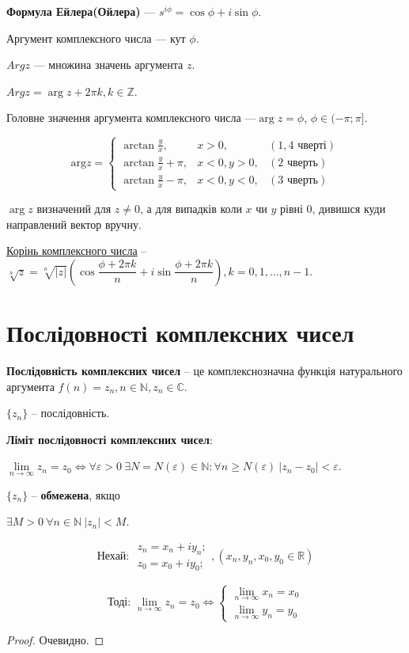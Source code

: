 \textbf{Формула Ейлера(Ойлера)} --- $s^{i \phi} = \cos \phi + i \sin \phi$.

Аргумент комплексного числа --- кут $\phi$.

$Arg z$ --- множина значень аргумента $z$.

$Arg z =  \arg z + 2 \pi k, k \in \mathbb{Z}$.

Головне значення аргумента комплексного числа ---$\arg z =  \phi$, $\phi \in ( - \pi; \pi ]$.

$$\text{arg}z = \left\{ \begin{array}{lcr}
\arctan{\frac{y}{x}},       & x>0,      & (1, 4 \text{ чверті}) \\
\arctan{\frac{y}{x}} + \pi, & x<0, y>0, & (2 \text{ чверть}) \\
\arctan{\frac{y}{x}} - \pi, & x<0, y<0, & (3 \text{ чверть})
\end{array}\right. $$

$\arg z$ визначений для $z \neq 0$, а для випадків коли $x$ чи $y$ рівні 0, дивишся куди направлений вектор вручну.

\underline{Корінь комплексного числа} -- $\sqrt[n]{z} = \sqrt[n]{|z|}(\cos\dfrac{\phi+2\pi k}{n} + i\sin\dfrac{\phi+2\pi k}{n}), k=0,1,...,n-1$.



\section{Послідовності комплексних чисел}

\textbf{Послідовність комплексних чисел} -- це комплекснозначна функція натурального аргумента $f(n) = z_n, n\in\mathbb{N}, z_n\in\mathbb{C}$.

$\{z_n\}$ -- послідовність.

\textbf{Ліміт послідовності комплексних чисел}:

$\lim\limits_{n\rightarrow\infty} z_n = z_0 \Leftrightarrow \forall\varepsilon > 0 ~ \exists N = N ( \varepsilon ) \in\mathbb{N} : \forall n \geqslant N(\varepsilon) ~ |z_n-z_0|<\varepsilon$.

$\{z_n\}$ -- \textbf{обмежена}, якщо 

$\exists M>0 ~ \forall n \in \mathbb{N} ~ |z_n|<M$.

\begin{theorem}
$$
\text{Нехай: } \begin{array}{l}
z_n=x_n+iy_n; \\
z_0=x_0+iy_0;
\end{array}, 
(x_n,y_n,x_0,y_0 \in \mathbb{R})
$$

$$
\text{Тоді: }\lim\limits_{n\rightarrow\infty} z_n = z_0 \Leftrightarrow 
\left\{ \begin{array}{l}
\lim\limits_{n\rightarrow\infty} x_n = x_0 \\
\lim\limits_{n\rightarrow\infty} y_n = y_0
\end{array}\right.
$$
\end{theorem}
\begin{proof}
Очевидно.
\end{proof}

